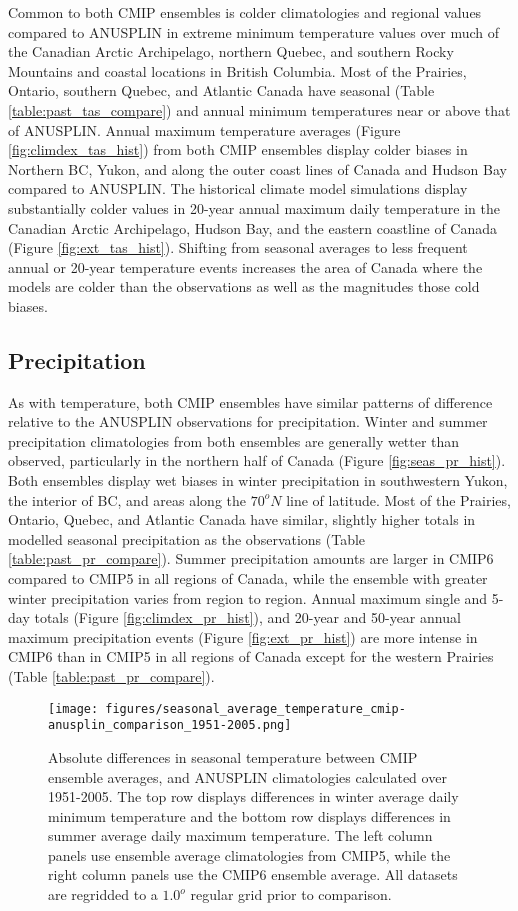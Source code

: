 \documentclass[]{scrartcl}
\begin{document}
Common to both CMIP ensembles is colder climatologies and regional values compared to ANUSPLIN in extreme minimum temperature values over much of the Canadian Arctic Archipelago, northern Quebec, and southern Rocky Mountains and coastal locations in British Columbia. Most of the Prairies, Ontario, southern Quebec, and Atlantic Canada have seasonal (Table \ref{table:past_tas_compare}) and annual minimum temperatures near or above that of ANUSPLIN. Annual maximum temperature averages (Figure \ref{fig:climdex_tas_hist}) from both CMIP ensembles display colder biases in Northern BC, Yukon, and along the outer coast lines of Canada and Hudson Bay compared to ANUSPLIN. The historical climate model simulations display substantially colder values in 20-year annual maximum daily temperature in the Canadian Arctic Archipelago, Hudson Bay, and the eastern coastline of Canada (Figure \ref{fig:ext_tas_hist}). Shifting from seasonal averages to less frequent annual or 20-year temperature events increases the area of Canada where the models are colder than the observations as well as the magnitudes those cold biases.


\subsection{Precipitation}
As with temperature, both CMIP ensembles have similar patterns of difference relative to the ANUSPLIN observations for precipitation. Winter and summer precipitation climatologies from both ensembles are generally wetter than observed, particularly in the northern half of Canada (Figure \ref{fig:seas_pr_hist}). Both ensembles display wet biases in winter precipitation in southwestern Yukon, the interior of BC, and areas along the $70^oN$ line of latitude. Most of the Prairies, Ontario, Quebec, and Atlantic Canada have similar, slightly higher totals in modelled seasonal precipitation as the observations (Table \ref{table:past_pr_compare}). Summer precipitation amounts are larger in CMIP6 compared to CMIP5 in all regions of Canada, while the ensemble with greater winter precipitation varies from region to region. Annual maximum single and 5-day totals (Figure \ref{fig:climdex_pr_hist}), and 20-year and 50-year annual maximum precipitation events (Figure \ref{fig:ext_pr_hist}) are more intense in CMIP6 than in CMIP5 in all regions of Canada except for the western Prairies (Table \ref{table:past_pr_compare}).  


\begin{figure}[ht!]
	\centering
	\texttt{[image: figures/seasonal\_average\_temperature\_cmip-anusplin\_comparison\_1951-2005.png]}
	\caption[Tas]{Absolute differences in seasonal temperature between CMIP ensemble averages, and ANUSPLIN climatologies calculated over 1951-2005. The top row displays differences in winter average daily minimum temperature and the bottom row displays differences in summer average daily maximum temperature. The left column panels use ensemble average climatologies from CMIP5, while the right column panels use the CMIP6 ensemble average. All datasets are regridded to a $1.0^o$ regular grid prior to comparison.}
	\label{fig:seas_tas_hist}
\end{figure}
\end{document}
